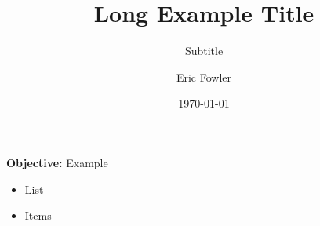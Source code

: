 \documentclass{beamer}
\title[Short Example]{Long Example Title}
\subtitle{Subtitle}
\author[Eric Fowler]{Eric Fowler}
\institute[Georgia Tech]{Georgia Tech School of Computational Science and Engineering \\
\vfill\hfill}
\date{\today}
\begin{document}
\frame{\titlepage}

\begin{frame}

    \textbf{Objective:} Example

    \begin{itemize}
        \item List
        \item Items
    \end{itemize}

\end{frame}
\end{document}

